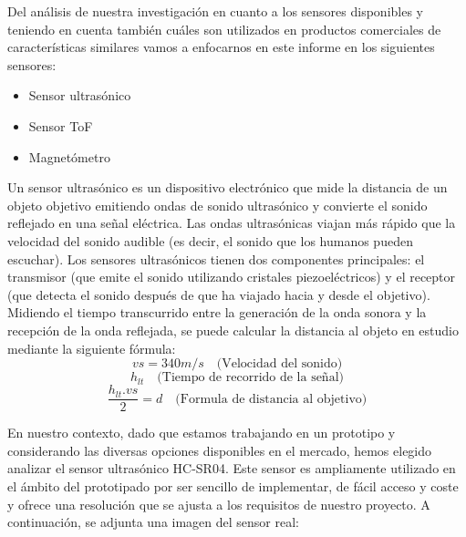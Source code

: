 Del análisis de nuestra investigación en cuanto a los sensores disponibles y teniendo en cuenta también cuáles son utilizados en productos comerciales de características similares vamos a enfocarnos en este informe en los siguientes sensores:
\begin{itemize}
    \item Sensor ultrasónico
    \item Sensor ToF
    \item Magnetómetro
\end{itemize}
Un sensor ultrasónico es un dispositivo electrónico que mide la distancia de un objeto
objetivo emitiendo ondas de sonido ultrasónico y convierte el sonido reflejado en una
señal eléctrica. Las ondas ultrasónicas viajan más rápido que la velocidad del sonido
audible (es decir, el sonido que los humanos pueden escuchar). Los sensores ultrasónicos
tienen dos componentes principales: el transmisor (que emite el sonido utilizando
cristales piezoeléctricos) y el receptor (que detecta el sonido después de que ha
viajado hacia y desde el objetivo). Midiendo el tiempo transcurrido entre la generación de la onda sonora y la recepción de la onda reflejada, se puede calcular la distancia al objeto en estudio mediante la
siguiente fórmula:
\begin{equation}
    vs = 340 m/s \quad\text{(Velocidad del sonido)}\label{eqn:velocidad_del_sonido}
\end{equation}
\begin{equation}
    h_{lt} \quad\text{(Tiempo de recorrido de la señal)} \label{eqn:tiempo_recorrido_señal}
\end{equation}
\begin{equation}
    \frac{h_{lt} . vs}{2} = d \quad\text{(Formula de distancia al objetivo)} \label{eqn:distancia_de_la_onda}
\end{equation}

En nuestro contexto, dado que estamos trabajando en un prototipo y considerando las diversas opciones disponibles en el mercado, hemos elegido analizar el sensor ultrasónico HC-SR04. Este sensor es ampliamente utilizado en el ámbito del prototipado por ser sencillo de implementar, de fácil acceso y coste y ofrece una resolución que se ajusta a los requisitos de nuestro proyecto. A continuación, se adjunta una imagen del sensor real:


